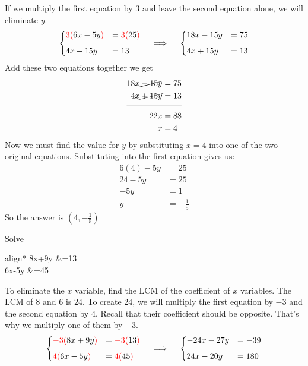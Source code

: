 %
If we multiply the first equation by $3$ and leave the second equation alone, we will eliminate $y$.
\[
\begin{dcases}
\textcolor{red}{3(}6x-5y\textcolor{red}{)} &=\textcolor{red}{3(}25\textcolor{red}{)} \\[1ex]
4x+15y &=13	
\end{dcases}
\quad\implies\quad
\begin{dcases}
18x-15y &=75 \\[1ex]
4x+15y &=13	
\end{dcases}
\]
%
Add these two equations together we get
\begin{align*}
18x \cancel{{}-15y} &= 75 \\
4x \cancel{{}+ 15y} &= 13 \\[-.2cm]
\cline{1-2}
22x &= 88 \\
x &= 4
\end{align*}
Now we must find the value for $y$ by substituting $x=4$ into one of the two original equations. Substituting into the first equation gives us:
		\begin{align*}
			6(4)-5y &=	25\\
			24-5y &= 25\\
			-5y &= 1\\
			y &= -\frac{1}{5}	
		\end{align*}
So the answer is $\displaystyle (4,-\frac{1}{5})$
\begin{example}
Solve 
		\begin{empheq}[left={\empheqlbrace}]{align*}
				8x+9y &=13\\
				6x-5y &=45	
		\end{empheq}
\end{example}
%
To eliminate the $x$ variable, find the LCM of the coefficient of $x$ variables. The LCM of $8$ and $6$ is $24$. To create $24$, we will multiply the first equation by $-3$  and the second equation by $4$. Recall that their coefficient should be opposite. That's why we multiply one of them by $-3$.
\[
\begin{dcases}
\textcolor{red}{-3(}8x+9y\textcolor{red}{)} &=\textcolor{red}{-3(}  13  \textcolor{red}{)} \\[1ex]
\textcolor{red}{4(}6x-5y\textcolor{red}{)} &=\textcolor{red}{4(}    45\textcolor{red}{)}	
\end{dcases}
\quad\implies\quad
\begin{dcases}
	-24x-27y &=-39 \\[1ex]
	24x-20y &=180
\end{dcases}
\]
